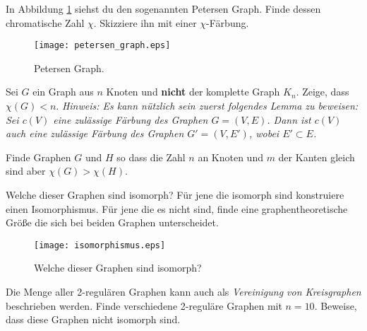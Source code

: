 \subexercise[%
  topic=Petersen Graph,
    ]
    In Abbildung \ref{petersen} siehst du den sogenannten Petersen Graph. Finde dessen chromatische Zahl $\chi$. Skizziere ihn mit einer $\chi$-F\"arbung.

\begin{figure}[h]
    \centering
    \texttt{[image: petersen\_graph.eps]}
    \caption{\label{petersen} Petersen Graph.}

\end{figure}

\subexercise[%
  topic=Eine Obergrenze f\"ur die chromatische Zahl,
    ]
Sei $G$ ein Graph aus $n$ Knoten und {\bf nicht} der komplette Graph $K_n$. Zeige, dass $\chi (G) < n$.
\emph{Hinweis: Es kann n\"utzlich sein zuerst folgendes Lemma zu beweisen: Sei $c(V)$ eine zul\"assige F\"arbung des Graphen $G=(V,E)$. Dann ist $c(V)$ auch eine zul\"assige F\"arbung des Graphen $G'=(V,E')$, wobei $E'\subset E$.}


\subexercise[%
  topic=Graphen gleicher Gr\"o\ss e mit unterschiedlichem Chromatischer Zahl,
    ]
		
		Finde Graphen $G$ und $H$ so dass die Zahl $n$ an Knoten und $m$ der Kanten gleich sind aber $\chi (G)> \chi (H)$.


\exercise[%
  topic = Graphisomorphismus 
    ]
		
		\subexercise[%
  topic=Isomorphie von Graphen untersuchen,
    ]
		
		Welche dieser Graphen sind isomorph? F\"ur jene die isomorph sind konstruiere einen Isomorphismus. F\"ur jene die es nicht sind, finde eine graphentheoretische Gr\"o\ss e die sich bei beiden Graphen unterscheidet.
		\begin{figure}[h]
    \centering
    \texttt{[image: isomorphismus.eps]}
    \caption{\label{isomorphismus} Welche dieser Graphen sind isomorph?}

\end{figure}

\subexercise[%
  topic=2-regul\"are Graphen,
    ]
Die Menge aller 2-regul\"aren Graphen kann auch als \emph{Vereinigung von Kreisgraphen} beschrieben werden. Finde verschiedene 2-regul\"are Graphen mit $n=10$. 
Beweise, dass diese Graphen nicht isomorph sind.
\clearpage 
\exercise[%
  topic = Kantenf\"arbung 
    ]

\subexercise[%
  topic=Kantenf\"arbung eines Graphen,
    ]

